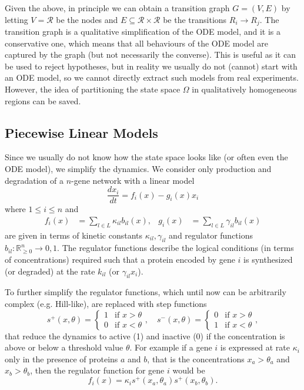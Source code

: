 \documentclass[a4paper]{article}
\theoremstyle{plain}
\theoremstyle{definition}
\theoremstyle{remark}
\begin{document}
Given the above, in principle we can obtain a transition graph $G = (V,E)$ by
letting $V = \mathcal{R}$ be the nodes and $E \subseteq \mathcal{R} \times
\mathcal{R}$ be the transitions $R_i \to R_j$. The transition graph is a
qualitative simplification of the ODE model, and it is a conservative one,
which means that all behaviours of the ODE model are captured by the graph
(but not necessarily the converse). This is useful as it can be used to reject
hypotheses, but in reality we usually do not (cannot) start with an ODE model,
so we cannot directly extract such models from real experiments. However, the
idea of partitioning the state space $\Omega$ in qualitatively homogeneous
regions can be saved.

\subsection{Piecewise Linear Models}

Since we usually do not know how the state space looks like (or often even the
ODE model), we simplify the dynamics. We consider only production and
degradation of a $n$-gene network with a linear model
\begin{equation} \label{eqn:}
  \frac{dx_i}{dt} = f_i(x) - g_i(x) x_i
\end{equation}
where $1 \leq i \leq n$ and
\begin{align*}
  f_i(x) &= \sum_{l \in L} \kappa_{il} b_{il} (x), &
  g_i(x) &= \sum_{l \in L} \gamma_{il} b_{il} (x)
\end{align*}
are given in terms of kinetic constants $\kappa_{il},\gamma_{il}$ and
regulator functions $b_{il} : \mathbb{R}^n_{\geq 0} \to {0,1}$. The regulator
functions describe the logical conditions (in terms of concentrations)
required such that a protein encoded by gene $i$ is synthesized (or degraded)
at the rate $k_{il}$ (or $\gamma_{il} x_i$).

To further simplify the regulator functions, which until now can be
arbitrarily complex (e.g. Hill-like), are replaced with step functions
\[
  s^+ (x, \theta) = \begin{cases}
    1 & \text{if } x > \theta \\
    0 & \text{if } x < \theta
  \end{cases},
  \quad
  s^- (x, \theta) = \begin{cases}
    0 & \text{if } x > \theta \\
    1 & \text{if } x < \theta
  \end{cases},
\]
that reduce the dynamics to active (1) and inactive (0) if the concentration
is above or below a threshold value $\theta$. For example if a gene $i$ is
expressed at rate $\kappa_i$ only in the presence of proteins $a$ and $b$,
that is the concentrations $x_a > \theta_a$ and $x_b > \theta_b$, then the
regulator function for gene $i$ would be
\[
  f_i(x) = \kappa_{i} s^+(x_a, \theta_a) s^+(x_b, \theta_b).
\]
\end{document}
